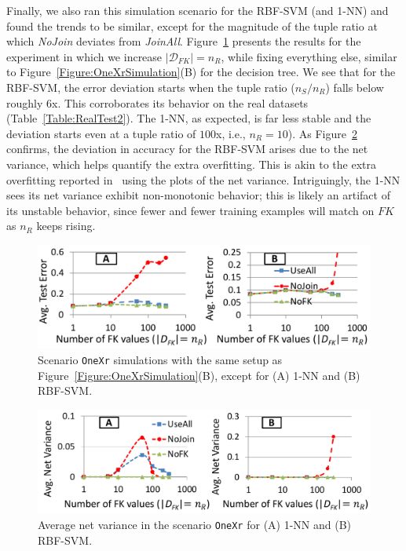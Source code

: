 \documentclass{vldb}
\begin{document}
Finally, we also ran this simulation scenario for the RBF-SVM (and 1-NN) and found the trends to be similar, except for the magnitude of the tuple ratio at which 
\textit{NoJoin} deviates from \textit{JoinAll}. Figure~\ref{Figure:OneXr1nnSVMSimulation} presents the results for the experiment in which we increase $|\mathcal{D}_{FK}|=n_R$, 
while fixing everything else, similar to Figure~\ref{Figure:OneXrSimulation}(B) for the decision tree. We see that for the RBF-SVM, the error deviation starts when the 
tuple ratio ($n_S/n_R$) falls below roughly $6$x. This corroborates its behavior on the real datasets (Table~\ref{Table:RealTest2}).
The 1-NN, as expected, is far less stable and the deviation starts even at a tuple ratio of $100$x, i.e., $n_R = 10$).
As Figure~\ref{Figure:OneXr1nnSVMSimulationVariance} confirms, the deviation in accuracy for the RBF-SVM arises due to the net variance, 
which helps quantify the extra overfitting. This is akin to the extra overfitting reported in~\cite{hamlet} using the plots of the net variance.
Intriguingly, the 1-NN sees its net variance exhibit non-monotonic behavior; this is likely an artifact of its unstable behavior, since fewer and fewer
training examples will match on $FK$ as $n_R$ keeps rising.

\begin{figure}[t]
\centering
\includegraphics[width=0.99\linewidth]{onexr_svm_1nn.pdf}
\vspace{1mm}
\caption{Scenario \texttt{OneXr} simulations with the same setup as Figure~\ref{Figure:OneXrSimulation}(B), except for (A) 1-NN and (B) RBF-SVM.}
\label{Figure:OneXr1nnSVMSimulation}
\end{figure}

\begin{figure}[t]
\centering
\includegraphics[width=0.99\linewidth]{variance.pdf}
\vspace{1mm}
\caption{Average net variance in the scenario \texttt{OneXr} for (A) 1-NN and (B) RBF-SVM.}
\label{Figure:OneXr1nnSVMSimulationVariance}
\end{figure}
\end{document}
